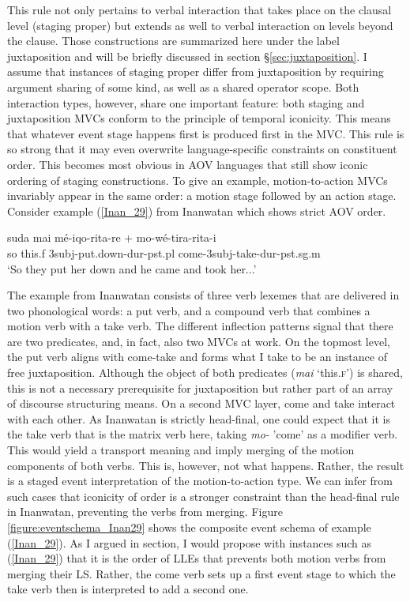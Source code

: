 This rule not only pertains to verbal interaction that takes place on the clausal level (staging proper) but extends as well to verbal interaction on levels beyond the clause. Those constructions are summarized here under the label juxtaposition and will be briefly discussed in section §\ref{sec:juxtaposition}. I assume that instances of staging proper differ from juxtaposition by requiring argument sharing of some kind, as well as a shared operator scope. Both interaction types, however, share one important feature: both staging and juxtaposition MVCs conform to the principle of temporal iconicity. This means that whatever event stage happens first is produced first in the MVC. This rule is so strong that it may even overwrite language-specific constraints on constituent order. This becomes most obvious in AOV languages that still show iconic ordering of staging constructions. To give an example, motion-to-action MVCs invariably appear in the same order: a motion stage followed by an action stage. Consider example (\ref{Inan_29}) from Inanwatan which shows strict AOV order.

\ea \label{Inan_29}
\gll suda mai mé-iqo-rita-re + mo-wé-tira-rita-i \\
so this.\acs{f} 3\acs{subj}-put.down-\acs{dur}-\acs{pst}.\acs{pl} come-3\acs{subj}-take-\acs{dur}-\acs{pst}.\acs{sg}.\acs{m} \\
\glft `So they put her down and he came and took her...' \ 
\z
\xe

The example from Inanwatan consists of three verb lexemes that are delivered in two phonological words: a put verb, and a compound verb that combines a motion verb with a take verb. The different inflection patterns signal that there are two predicates, and, in fact, also two MVCs at work. On the topmost level, the put verb aligns with come-take and forms what I take to be an instance of free juxtaposition. Although the object of both predicates (\textit{mai} `this.\textsc{f}') is shared, this is not a necessary prerequisite for juxtaposition but rather part of an array of discourse structuring means. On a second MVC layer, come and take interact with each other. As Inanwatan is strictly head-final, one could expect that it is the take verb that is the matrix verb here, taking \textit{mo-} 'come' as a modifier verb. This would yield a transport meaning and imply merging of the motion components of both verbs. This is, however, not what happens. Rather, the result is a staged event interpretation of the motion-to-action type. We can infer from such cases that iconicity of order is a stronger constraint than the head-final rule in Inanwatan, preventing the verbs from merging. Figure \ref{figure:eventschema_Inan29} shows the composite event schema of example (\ref{Inan_29}). As I argued in section, I would propose with instances such as (\ref{Inan_29}) that it is the order of LLEs that prevents both motion verbs from merging their LS. Rather, the come verb sets up a first event stage to which the take verb then is interpreted to add a second one.

